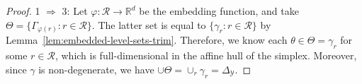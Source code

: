 \documentclass[12pt]{article}
\newcommand{\Comments}{1}
\newcommand{\mynote}[2]{\ifnum\Comments=1\textcolor{#1}{#2}\fi}
\newcommand{\jessie}[1]{\mynote{teal}{[JF: #1]}}
\newcommand{\reals}{\mathbb{R}}
\newcommand{\simplex}{\Delta_\Y}
\newcommand{\R}{\mathcal{R}}
\newcommand{\Y}{\mathcal{Y}}
\newcommand{\risk}[1]{\underline{#1}}
\newcommand{\trim}{\mathrm{trim}}
\begin{document}
\begin{proof}
  
  1 $\Rightarrow$ 3: 
  Let $\varphi: \R \to \reals^d$ be the embedding function, and take $\Theta = \{\Gamma_{\varphi(r)} : r \in \R\}$.
  The latter set is equal to $\{\gamma_r : r \in \R\}$ by Lemma~\ref{lem:embedded-level-sets-trim}.
  Therefore, we know each $\theta \in \Theta = \gamma_r$ for some $r \in \R$, which is full-dimensional in the affine hull of the simplex.
  Moreover, since $\gamma$ is non-degenerate, we have $\cup \Theta = \cup_r \gamma_r = \simplex$.
  

\end{proof}
\end{document}
